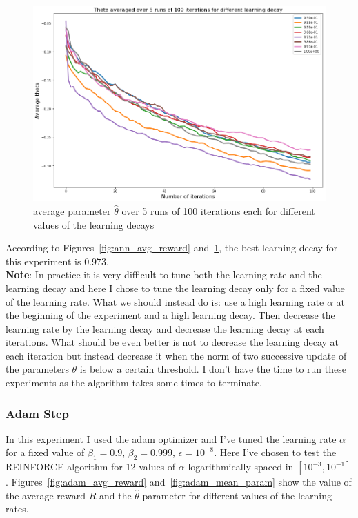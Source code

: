 \documentclass[11pt]{article}
\numberwithin{figure}{section} %
\begin{document}
\begin{figure}[H]
		\centering
		\includegraphics[width=0.9\linewidth]{images/ld_theta_consistent}
		\caption{average parameter $\widehat{\theta}$ over 5 runs of 100 iterations each for different values of the learning decays}
		\label{fig:ann_mean_param}
\end{figure}

According to Figures~\ref{fig:ann_avg_reward} and~\ref{fig:ann_mean_param}, the best learning decay for this experiment is $0.973$. \\
\textbf{Note}: In practice it is very difficult to tune both the learning rate and the learning decay and here I chose to tune the learning decay only for a fixed value of the learning rate. What we should instead do is: use a high learning rate $\alpha$ at the beginning of the experiment and a high learning decay. Then decrease the learning rate by the learning decay and decrease the learning decay at each iterations. What should be even better is not to decrease the learning decay at each iteration but instead decrease it when the norm of two successive update of the parameters $\theta$ is below a certain threshold. I don't have the time to run these experiments as the algorithm takes some times to terminate.

\subsubsection{Adam Step}
In this experiment I used the adam optimizer and I've tuned the learning rate $\alpha$for a fixed value of $\beta_1 = 0.9$, $\beta_2 = 0.999$, $\epsilon = 10^{-8}$. Here I've chosen to test the REINFORCE algorithm for 12 values of $\alpha$ logarithmically spaced in $[10^{-3}, 10^{-1}]$. Figures~\ref{fig:adam_avg_reward} and~\ref{fig:adam_mean_param} show the value of the average reward $R$ and the $\widehat{\theta}$ parameter for different values of the learning rates.
\end{document}
